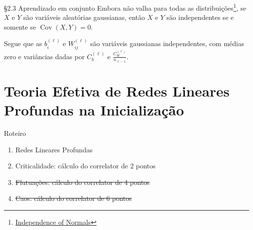 \documentclass{beamer}
\DeclareMathOperator{\Cov}{Cov}
\begin{document}
\begin{frame}{\S 2.3 Aprendizado em conjunto}
	Embora não valha para todas as distribuições\footnote{\href{https://almostsuremath.com/2021/03/24/independence-of-normals/}{Independence of Normals}}, se $X$ e $Y$ são variáveis aleatórias gaussianas, então $X$ e $Y$ são independentes se e somente se $\Cov(X,Y) = 0$.  

	\medskip

	Segue que as $b^{(\ell)}_i$ e $W^{(\ell)}_{ij}$ são variáveis gaussianas independentes, com médias zero e variâncias dadas por $C_b^{(\ell)}$ e $\frac{C_W^{(\ell)}}{n_{\ell-1}}$.
\end{frame}

\section{Teoria Efetiva de Redes Lineares Profundas na Inicialização}

\begin{frame}
	\tableofcontents[currentsection]
\end{frame}

\begin{frame}{Roteiro}
	\begin{enumerate}[\S 3.1]
		\item Redes Lineares Profundas
		\item Criticalidade: cálculo do correlator de 2 pontos
		\item \sout{Flutuações: cálculo do correlator de 4 pontos}
		\item \sout{Caos: cálculo do correlator de 6 pontos}
	\end{enumerate}
	
\end{frame}
\end{document}
